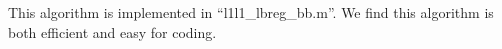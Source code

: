 \documentclass[conference,onecolumn,12pt]{IEEEtran}
\newcommand{\<}{\langle}
\renewcommand{\>}{\rangle}
\numberwithin{equation}{section}
\begin{document}
This algorithm is implemented in ``l1l1\_lbreg\_bb.m''. We find this algorithm is both efficient and easy for coding.







\end{document}
